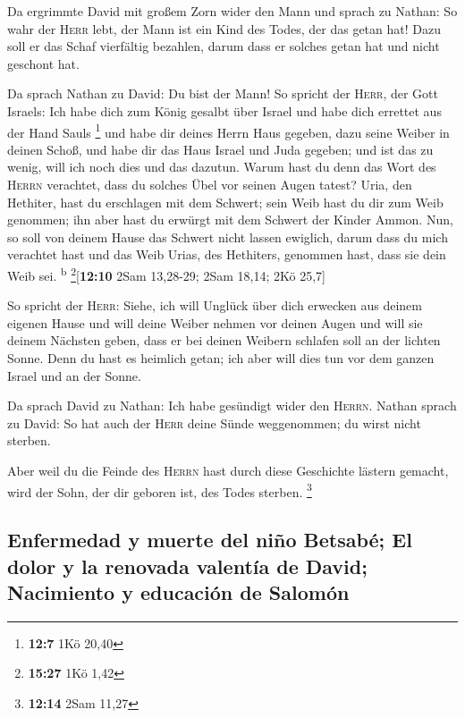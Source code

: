  Da ergrimmte David mit großem Zorn wider den Mann und
sprach zu Nathan: So wahr der \textsc{Herr} lebt, der Mann ist ein Kind
des Todes, der das getan hat!  Dazu soll er das Schaf
vierfältig bezahlen, darum dass er solches getan hat und nicht geschont
hat.

 Da sprach Nathan zu David: Du bist der Mann! So spricht
der \textsc{Herr}, der Gott Israels: Ich habe dich zum König gesalbt
über Israel und habe dich errettet aus der Hand Sauls \footnote{\textbf{12:7}
  1Kö 20,40}  und habe dir deines Herrn Haus gegeben, dazu
seine Weiber in deinen Schoß, und habe dir das Haus Israel und Juda
gegeben; und ist das zu wenig, will ich noch dies und das dazutun.
 Warum hast du denn das Wort des \textsc{Herrn} verachtet,
dass du solches Übel vor seinen Augen tatest? Uria, den Hethiter, hast
du erschlagen mit dem Schwert; sein Weib hast du dir zum Weib genommen;
ihn aber hast du erwürgt mit dem Schwert der Kinder Ammon.
 Nun, so soll von deinem Hause das Schwert nicht lassen
ewiglich, darum dass du mich verachtet hast und das Weib Urias, des
Hethiters, genommen hast, dass sie dein Weib sei. \textsuperscript{b}
\footnote{\textbf{15:27} 1Kö 1,42}{[}\textbf{12:10} 2Sam 13,28-29; 2Sam
18,14; 2Kö 25,7{]}

 So spricht der \textsc{Herr}: Siehe, ich will Unglück
über dich erwecken aus deinem eigenen Hause und will deine Weiber nehmen
vor deinen Augen und will sie deinem Nächsten geben, dass er bei deinen
Weibern schlafen soll an der lichten Sonne.  Denn du hast
es heimlich getan; ich aber will dies tun vor dem ganzen Israel und an
der Sonne.

 Da sprach David zu Nathan: Ich habe gesündigt wider den
\textsc{Herrn}. Nathan sprach zu David: So hat auch der \textsc{Herr}
deine Sünde weggenommen; du wirst nicht sterben.

 Aber weil du die Feinde des \textsc{Herrn} hast durch
diese Geschichte lästern gemacht, wird der Sohn, der dir geboren ist,
des Todes sterben. \footnote{\textbf{12:14} 2Sam 11,27}

\hypertarget{enfermedad-y-muerte-del-niuxf1o-betsabuxe9-el-dolor-y-la-renovada-valentuxeda-de-david-nacimiento-y-educaciuxf3n-de-salomuxf3n}{%
\subsection{Enfermedad y muerte del niño Betsabé; El dolor y la renovada
valentía de David; Nacimiento y educación de
Salomón}\label{enfermedad-y-muerte-del-niuxf1o-betsabuxe9-el-dolor-y-la-renovada-valentuxeda-de-david-nacimiento-y-educaciuxf3n-de-salomuxf3n}}

